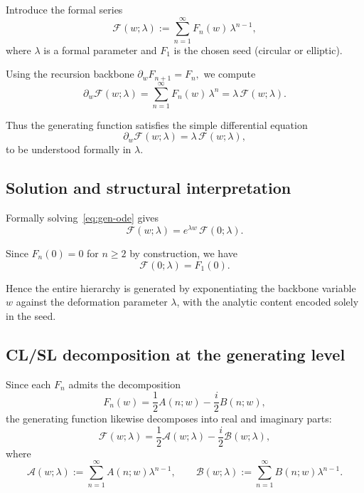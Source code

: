 \documentclass[11pt]{article}
\begin{document}
Introduce the formal series
\begin{equation}\label{eq:gen-series}
\mathcal{F}(w;\lambda)
:=
\sum_{n=1}^{\infty} F_n(w)\,\lambda^{n-1},
\end{equation}
where $\lambda$ is a formal parameter and $F_1$ is the chosen seed
(circular or elliptic).

Using the recursion backbone
\(
\partial_w F_{n+1}=F_n,
\)
we compute
\[
\partial_w \mathcal{F}(w;\lambda)
=
\sum_{n=1}^{\infty} F_n(w)\,\lambda^{n}
=
\lambda\,\mathcal{F}(w;\lambda).
\]

Thus the generating function satisfies the simple differential equation
\begin{equation}\label{eq:gen-ode}
\partial_w \mathcal{F}(w;\lambda)
=
\lambda\,\mathcal{F}(w;\lambda),
\end{equation}
to be understood formally in $\lambda$.


\subsection{Solution and structural interpretation}

Formally solving~\eqref{eq:gen-ode} gives
\begin{equation}\label{eq:gen-solution}
\mathcal{F}(w;\lambda)
=
e^{\lambda w}\,\mathcal{F}(0;\lambda).
\end{equation}

Since $F_n(0)=0$ for $n\ge2$ by construction,
we have
\[
\mathcal{F}(0;\lambda)=F_1(0).
\]

Hence the entire hierarchy is generated by exponentiating
the backbone variable $w$ against the deformation parameter $\lambda$,
with the analytic content encoded solely in the seed.


\subsection{CL/SL decomposition at the generating level}

Since each $F_n$ admits the decomposition
\[
F_n(w)
=
\frac12 A(n;w)
-\frac{i}{2} B(n;w),
\]
the generating function likewise decomposes into real and imaginary parts:
\begin{equation}\label{eq:gen-CLSL}
\mathcal{F}(w;\lambda)
=
\frac12 \mathcal{A}(w;\lambda)
-\frac{i}{2} \mathcal{B}(w;\lambda),
\end{equation}
where
\[
\mathcal{A}(w;\lambda)
:=
\sum_{n=1}^{\infty} A(n;w)\lambda^{n-1},
\qquad
\mathcal{B}(w;\lambda)
:=
\sum_{n=1}^{\infty} B(n;w)\lambda^{n-1}.
\]
\end{document}

